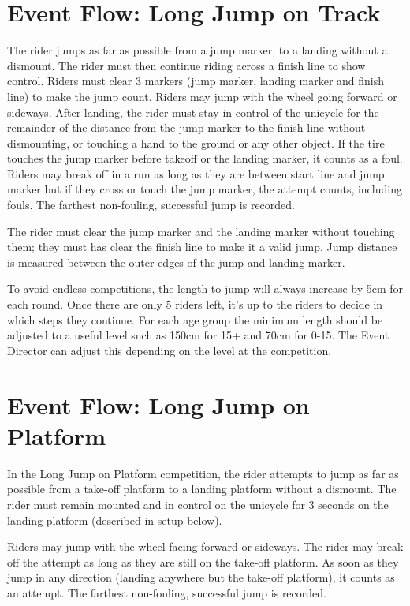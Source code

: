 \section{Event Flow: Long Jump on Track}
The rider jumps as far as possible from a jump marker, to a landing without a dismount.
The rider must then continue riding across a finish line to show control.
Riders must clear 3 markers (jump marker, landing marker and finish line) to make the jump count.
Riders may jump with the wheel going forward or sideways.
After landing, the rider must stay in control of the unicycle for the remainder of the distance from the jump marker to the finish line without dismounting, or touching a hand to the ground or any other object.
If the tire touches the jump marker before takeoff or the landing marker, it counts as a foul.
Riders may break off in a run as long as they are between start line and jump marker but if they cross or touch the jump marker, the attempt counts, including fouls.
The farthest non-fouling, successful jump is recorded.

The rider must clear the jump marker and the landing marker without touching them; they must has clear the finish line to make it a valid jump.
Jump distance is measured between the outer edges of the jump and landing marker.

To avoid endless competitions, the length to jump will always increase by 5cm for each round.
Once there are only 5 riders left, it's up to the riders to decide in which steps they continue.
For each age group the minimum length should be adjusted to a useful level such as 150cm for 15+ and 70cm for 0-15.
The Event Director can adjust this depending on the level at the competition.

\section{Event Flow: Long Jump on Platform}
In the Long Jump on Platform competition, the rider attempts to jump as far as possible from a take-off platform to a landing platform without a dismount.
The rider must remain mounted and in control on the unicycle for 3 seconds on the landing platform (described in setup below).

Riders may jump with the wheel facing forward or sideways.
The rider may break off the attempt as long as they are still on the take-off platform.
As soon as they jump in any direction (landing anywhere but the take-off platform), it counts as an attempt.
The farthest non-fouling, successful jump is recorded.

